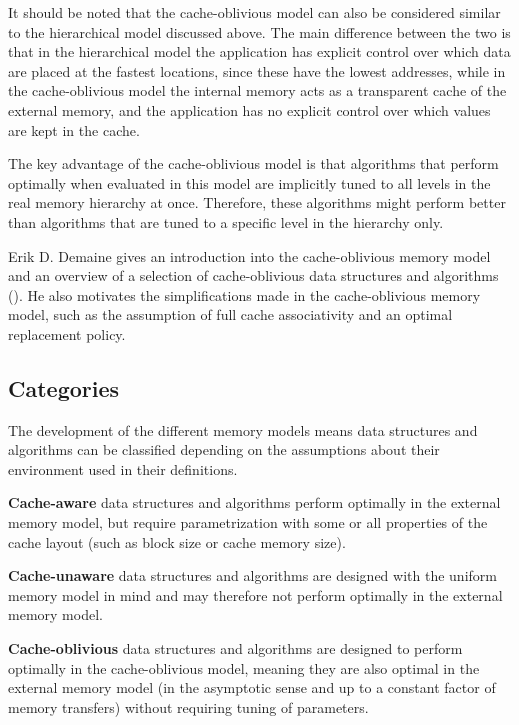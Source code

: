 \documentclass{acm_proc_article-sp}
\begin{document}
It should be noted that the cache-oblivious model can also be considered similar to the hierarchical model discussed above. The main difference between the two is that in the hierarchical model the application has explicit control over which data are placed at the fastest locations, since these have the lowest addresses, while in the cache-oblivious model the internal memory acts as a transparent cache of the external memory, and the application has no explicit control over which values are kept in the cache.

The key advantage of the cache-oblivious model is that algorithms that perform optimally when evaluated in this model are implicitly tuned to all levels in the real memory hierarchy at once. Therefore, these algorithms might perform better than algorithms that are tuned to a specific level in the hierarchy only.

Erik D. Demaine gives an introduction into the cache-oblivious memory model and an overview of a selection of cache-oblivious data structures and algorithms (\cite{demaine2002coa}). He also motivates the simplifications made in the cache-oblivious memory model, such as the assumption of full cache associativity and an optimal replacement policy.

\subsection{Categories}
The development of the different memory models means data structures and algorithms can be classified depending on the assumptions about their environment used in their definitions.
\begin{list}{}{}
\item \textbf{Cache-aware} data structures and algorithms perform optimally in the external memory model, but require parametrization with some or all properties of the cache layout (such as block size or cache memory size).
\item \textbf{Cache-unaware} data structures and algorithms are designed with the uniform memory model in mind and may therefore not perform optimally in the external memory model.
\item \textbf{Cache-oblivious} data structures and algorithms are designed to perform optimally in the cache-oblivious model, meaning they are also optimal in the external memory model (in the asymptotic sense and up to a constant factor of memory transfers) without requiring tuning of parameters.
\end{list}
\end{document}
